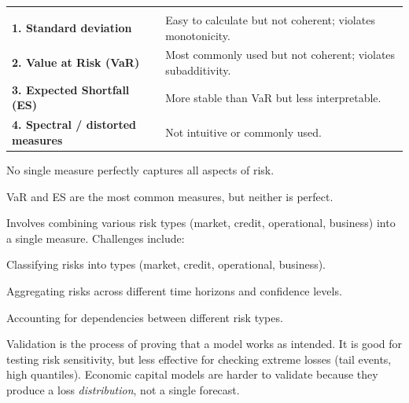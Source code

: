 \noindent\begin{minipage}{\textwidth}
\renewcommand{\arraystretch}{1.35}
\begin{tabularx}{\textwidth}{@{}L{0.28\textwidth}Y@{}}
  & \\
{\tabfont \textbf{1. Standard deviation}} & {\tabfont Easy to calculate but not coherent; violates monotonicity.}\\
{\tabfont \textbf{2. Value at Risk (VaR)}} & {\tabfont Most commonly used but not coherent; violates subadditivity.}\\
{\tabfont \textbf{3. Expected Shortfall (ES)}} & {\tabfont More stable than VaR but less interpretable.}\\
{\tabfont \textbf{4. Spectral / distorted measures}} & {\tabfont Not intuitive or commonly used.}\\
\end{tabularx}
\end{minipage}

\begin{lettered}
\item No single measure perfectly captures all aspects of risk.
\item VaR and ES are the most common measures, but neither is perfect.
\end{lettered}


Involves combining various risk types (market, credit, operational, business) into
a single measure. Challenges include:

\begin{lettered}
\item Classifying risks into types (market, credit, operational, business).
\item Aggregating risks across different time horizons and confidence levels.
\item Accounting for dependencies between different risk types.
\end{lettered}


\begin{orkeybox}
Validation is the process of proving that a model works as intended. It is good
for testing risk sensitivity, but less effective for checking extreme losses (tail
events, high quantiles). Economic capital models are harder to validate because
they produce a loss \emph{distribution}, not a single forecast.
\end{orkeybox}

